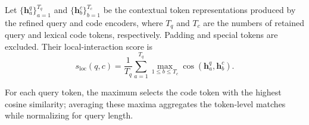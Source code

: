 \documentclass[11pt]{article}
\begin{document}
Let \(\{\mathbf{h}^{q}_{a}\}_{a=1}^{T_q}\) and \(\{\mathbf{h}^{c}_{b}\}_{b=1}^{T_c}\) be the contextual token representations produced by the refined query and code encoders, where \(T_q\) and \(T_c\) are the numbers of retained query and lexical code tokens, respectively. Padding and special tokens are excluded. Their local-interaction score is
\begin{equation}
  s_{\mathrm{loc}}(q,c)=\frac{1}{T_q}\sum_{a=1}^{T_q}
  \max_{1\leq b\leq T_c}
  \cos(\mathbf{h}^{q}_{a},\mathbf{h}^{c}_{b}).
  \label{eq:maxsim}
\end{equation}

For each query token, the maximum selects the code token with the highest cosine similarity; averaging these maxima aggregates the token-level matches while normalizing for query length.
\end{document}
